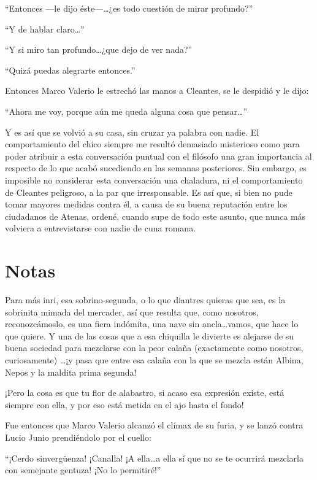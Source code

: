 \documentclass[11pt,openany]{book}
\begin{document}
“Entonces —le dijo éste—\dots ¿es todo cuestión de mirar profundo?” 

“Y de hablar claro\dots” 

“Y si miro tan profundo\dots ¿que dejo de ver nada?” 

“Quizá puedas alegrarte entonces.” 

Entonces Marco Valerio le estrechó las manos a Cleantes, se le despidió y le dijo: 

“Ahora me voy, porque aún me queda alguna cosa que pensar\dots” 

Y es así que se volvió a su casa, sin cruzar ya palabra con nadie. El comportamiento del chico siempre me resultó demasiado misterioso como para poder atribuir a esta conversación puntual con el filósofo una gran importancia al respecto de lo que acabó sucediendo en las semanas posteriores. Sin embargo, es imposible no considerar esta conversación una chaladura, ni el comportamiento de Cleantes peligroso, a la par que irresponsable. Es así que, si bien no pude tomar mayores medidas contra él, a causa de su buena reputación entre los ciudadanos de Atenas, ordené, cuando supe de todo este asunto, que nunca más volviera a entrevistarse con nadie de cuna romana. 



\chapter*{Notas}


Para más inri, esa sobrino-segunda, o lo que diantres quieras que sea, es la sobrinita mimada del mercader, así que resulta que, como nosotros, reconozcámoslo, es una fiera indómita, una nave sin ancla\dots vamos, que hace lo que quiere. Y una de las cosas que a esa chiquilla le divierte es alejarse de su buena sociedad para mezclarse con la peor calaña (exactamente como nosotros, curiosamente) \dots ¡y pasa que entre esa calaña con la que se mezcla están Albina, Nepos y la maldita prima segunda! 

¡Pero la cosa es que tu flor de alabastro, si acaso esa expresión existe, está siempre con ella, y por eso está metida en el ajo hasta el fondo!

Fue entonces que Marco Valerio alcanzó el clímax de su furia, y se lanzó contra Lucio Junio prendiéndolo por el cuello: 

“¡Cerdo sinvergüenza! ¡Canalla! ¡A ella\dots a ella sí que no se te ocurrirá mezclarla con semejante gentuza! ¡No lo permitiré!” 
\end{document}
